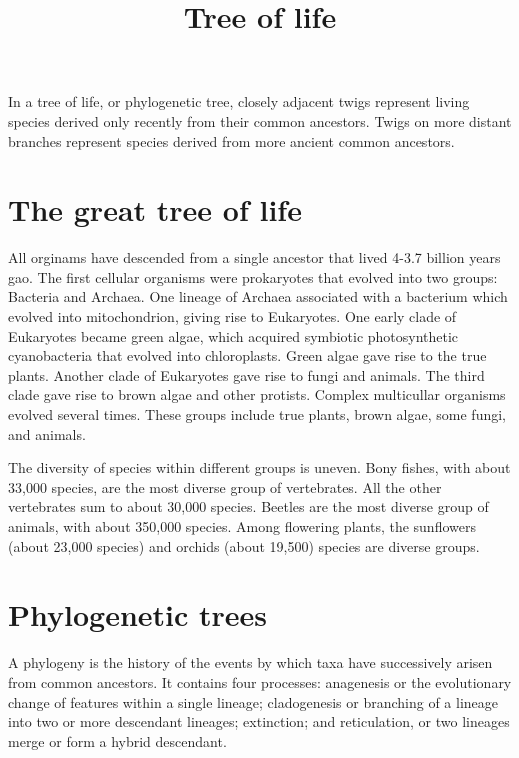 \documentclass[11pt]{article}
\title{Tree of life}
\author{}
\date{}
\begin{document}
\begin{sloppypar}
  \maketitle

  \linenumbers
In a tree of life, or phylogenetic tree, closely adjacent twigs represent living species derived only recently from their common ancestors. 
Twigs on more distant branches represent species derived from more ancient common ancestors.

\section{The great tree of life}
All orginams have descended from a single ancestor that lived 4-3.7 billion years gao. 
The first cellular organisms were prokaryotes that evolved into two groups: Bacteria and Archaea. 
One lineage of Archaea associated with a bacterium which evolved into mitochondrion, giving rise to Eukaryotes. 
One early clade of Eukaryotes became green algae, which acquired symbiotic photosynthetic cyanobacteria that evolved into chloroplasts. 
Green algae gave rise to the true plants. 
Another clade of Eukaryotes gave rise to fungi and animals. 
The third clade gave rise to brown algae and other protists. 
Complex multicullar organisms evolved several times. 
These groups include true plants, brown algae, some fungi, and animals. 

\par

The diversity of species within different groups is uneven. 
Bony fishes, with about 33,000 species, are the most diverse group of vertebrates. 
All the other vertebrates sum to about 30,000 species. 
Beetles are the most diverse group of animals, with about 350,000 species. 
Among flowering plants, the sunflowers (about 23,000 species) and orchids (about 19,500) species are diverse groups. 

\section{Phylogenetic trees}
A phylogeny is the history of the events by which taxa have successively arisen from common ancestors. 
It contains four processes: 
anagenesis or the evolutionary change of features within a single lineage; 
cladogenesis or branching of a lineage into two or more descendant lineages; 
extinction; and 
reticulation, or two lineages merge or form a hybrid descendant. 


\end{sloppypar}
\end{document}
